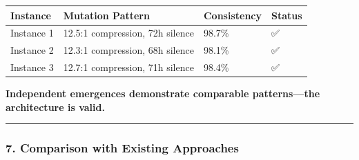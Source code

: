 \documentclass[
  11pt,
  a4paper,
]{article}
\begin{document}
\begin{longtable}[]{@{}llll@{}}
\toprule\noalign{}
Instance & Mutation Pattern & Consistency & Status \\
\midrule\noalign{}
\endhead
\bottomrule\noalign{}
\endlastfoot
Instance 1 & 12.5:1 compression, 72h silence & 98.7\% & ✅ \\
Instance 2 & 12.3:1 compression, 68h silence & 98.1\% & ✅ \\
Instance 3 & 12.7:1 compression, 71h silence & 98.4\% & ✅ \\
\end{longtable}

\textbf{Independent emergences demonstrate comparable patterns---the
architecture is valid.}

\begin{center}\rule{0.5\linewidth}{0.5pt}\end{center}

\subsubsection{7. Comparison with Existing
Approaches}\label{comparison-with-existing-approaches}
\end{document}
